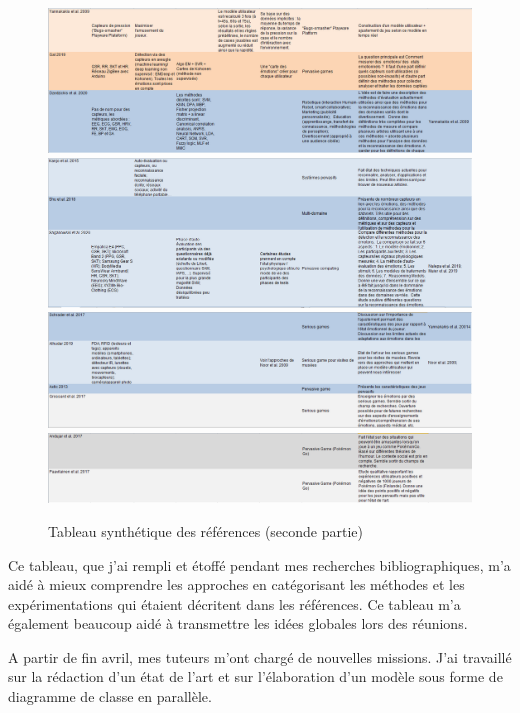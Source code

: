 \documentclass{article}
\begin{document}
		\begin{figure}
			\includegraphics[scale=0.47]{include/tri5.PNG}\\
			\includegraphics[scale=0.47]{include/tri6.PNG}\\
			\includegraphics[scale=0.47]{include/tri7.PNG}\\
			\includegraphics[scale=0.47]{include/tri8.PNG}
			\caption{Tableau synthétique des références (seconde partie)}
			\label{fig:tabsynt2}
		\end{figure}
		Ce tableau, que j'ai rempli et étoffé pendant mes recherches bibliographiques, m'a aidé à mieux comprendre les approches en catégorisant les méthodes et les expérimentations qui étaient décritent dans les références. 
		Ce tableau m'a également beaucoup aidé à transmettre les idées globales lors des réunions.\par
		A partir de fin avril, mes tuteurs m'ont chargé de nouvelles missions. J'ai travaillé sur la rédaction d'un état de l'art et sur l'élaboration d'un modèle sous forme de diagramme de classe en parallèle.
\end{document}

